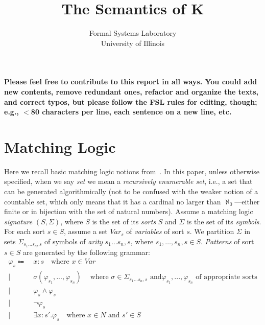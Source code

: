 \documentclass[UTF8]{article}
\title{The Semantics of K}
\author{Formal Systems Laboratory \\
          University of Illinois}
\newcommand{\comment}[1]
    {\par {\bfseries \color{blue} #1 \par}} %
\theoremstyle{plain}
\theoremstyle{definition}
\theoremstyle{remark}
\newcommand{\cln}{{:}}
\begin{document}
\maketitle

\comment{Please feel free to contribute to this report in all ways.
You could add new contents, remove redundant ones, refactor and
organize the texts, and correct typos, but please follow the FSL rules for editing, though; e.g., $<$80 characters per line,
each sentence on a new line, etc. }

\section{Matching Logic}

\newcommand{\Var}{\textit{Var}}
\newcommand{\Nat}{\textit{Nat}}

Here we recall basic matching logic notions from~\cite{rosu-2017-lmcs}.
In this paper, unless otherwise specified, when we say \emph{set} we mean
a \emph{recursively enumerable set}, i.e., a set that can be generated
algorithmically (not to be confused with the weaker notion of a
countable set, which only means that it has a cardinal no larger than
$\aleph_0$---either finite or in bijection with the set
of natural numbers).
Assume a matching logic \emph{signature} $(S, \Sigma)$, where $S$ is the
set of its \emph{sorts} $S$ and $\Sigma$ is the set of its \emph{symbols}.
For each sort $s \in S$, assume a set $\Var_s$ of \emph{variables} of
sort $s$.
We partition $\Sigma$ in sets $\Sigma_{s_1 \ldots s_n, s}$ of symbols
of \emph{arity} $s_1\ldots s_n,s$, where
$s_1,\ldots, s_n, s \in S$.
\emph{Patterns} of sort $s \in S$ are generated by the following grammar:
\begin{align*}
\varphi_s \Coloneqq\  &x \cln s \quad \text{where $x \in \Var$} \\
\mid\  &\sigma(\varphi_{s_1},...,\varphi_{s_n}) \quad\
\text{where $\sigma \in \Sigma_{s_1 \ldots s_n, s}$ and
$\varphi_{s_1},...,\varphi_{s_n}$ of appropriate sorts} \\
\mid\  &\varphi_s \wedge \varphi_s \\
\mid\  &\neg \varphi_s \\
\mid\  &\exists x \cln s' . \varphi_s \quad \text{where $x \in N$ and $s' \in S$}
\end{align*}
\begingroup\vspace*{-\baselineskip}
\label{ml-grammar}
\vspace*{\baselineskip}\endgroup
\end{document}
